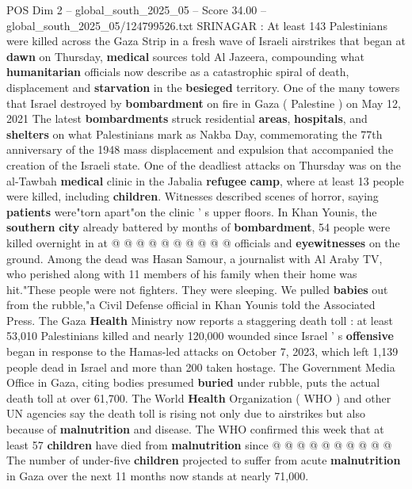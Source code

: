 \begin{textsample}{POS Dim 2 – global\_south\_2025\_05 – Score 34.00 – global\_south\_2025\_05/124799526.txt}  \label{ex:f2_pos_041}
SRINAGAR : At least 143 Palestinians were killed across the Gaza Strip in a fresh wave of Israeli airstrikes that began at \textbf{dawn} on Thursday, \textbf{medical} sources told Al Jazeera, compounding what \textbf{humanitarian} officials now describe as a catastrophic spiral of death, displacement and \textbf{starvation} in the \textbf{besieged} territory.
One of the many towers that Israel destroyed by \textbf{bombardment} on fire in Gaza ( Palestine ) on May 12, 2021 The latest \textbf{bombardments} struck residential \textbf{areas}, \textbf{hospitals}, and \textbf{shelters} on what Palestinians mark as Nakba Day, commemorating the 77th anniversary of the 1948 mass displacement and expulsion that accompanied the creation of the Israeli state.
One of the deadliest attacks on Thursday was on the al-Tawbah \textbf{medical} clinic in the Jabalia \textbf{refugee} \textbf{camp}, where at least 13 people were killed, including \textbf{children}.
Witnesses described scenes of horror, saying \textbf{patients} were"torn apart"on the clinic ' s upper floors.
In Khan Younis, the \textbf{southern} \textbf{city} already battered by months of \textbf{bombardment}, 54 people were killed overnight in at @ @ @ @ @ @ @ @ @ @ officials and \textbf{eyewitnesses} on the ground.
Among the dead was Hasan Samour, a journalist with Al Araby TV, who perished along with 11 members of his family when their home was hit."These people were not fighters.
They were sleeping.
We pulled \textbf{babies} out from the rubble,"a Civil Defense official in Khan Younis told the Associated Press.
The Gaza \textbf{Health} Ministry now reports a staggering death toll : at least 53,010 Palestinians killed and nearly 120,000 wounded since Israel ' s \textbf{offensive} began in response to the Hamas-led attacks on October 7, 2023, which left 1,139 people dead in Israel and more than 200 taken hostage.
The Government Media Office in Gaza, citing bodies presumed \textbf{buried} under rubble, puts the actual death toll at over 61,700.
The World \textbf{Health} Organization ( WHO ) and other UN agencies say the death toll is rising not only due to airstrikes but also because of \textbf{malnutrition} and disease.
The WHO confirmed this week that at least 57 \textbf{children} have died from \textbf{malnutrition} since @ @ @ @ @ @ @ @ @ @ The number of under-five \textbf{children} projected to suffer from acute \textbf{malnutrition} in Gaza over the next 11 months now stands at nearly 71,000.

\end{textsample}
